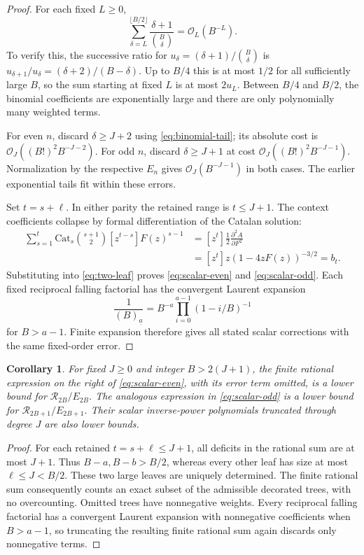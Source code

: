 \documentclass[11pt,letterpaper]{article}
\numberwithin{equation}{section}
\newtheorem{corollary}[theorem]{Corollary}
\theoremstyle{remark}\newtheorem{remark}[theorem]{Remark}
\newcommand{\Ord}{\mathcal O}
\newcommand{\fall}[2]{(#1)_{\underline{#2}}}
\begin{document}
\begin{proof}
For each fixed $L\ge0$,
\begin{equation}\label{eq:binomial-tail}
 \sum_{\delta=L}^{\lfloor B/2\rfloor}
        \frac{\delta+1}{\binom B\delta}=\Ord_L(B^{-L}).
\end{equation}
To verify this, the successive ratio for
$u_\delta=(\delta+1)/\binom B\delta$ is
$u_{\delta+1}/u_\delta=(\delta+2)/(B-\delta)$. Up to $B/4$ this is at most $1/2$ for all sufficiently large $B$, so the sum starting at fixed $L$ is at most $2u_L$. Between $B/4$ and $B/2$, the binomial coefficients are exponentially large and there are only polynomially many weighted terms.

For even $n$, discard $\delta\ge J+2$ using \eqref{eq:binomial-tail}; its absolute cost is $\Ord_J((B!)^2B^{-J-2})$. For odd $n$, discard $\delta\ge J+1$ at cost $\Ord_J((B!)^2B^{-J-1})$. Normalization by the respective $E_n$ gives $\Ord_J(B^{-J-1})$ in both cases. The earlier exponential tails fit within these errors.

Set $t=s+\ell$. In either parity the retained range is $t\le J+1$. The context coefficients collapse by formal differentiation of the Catalan solution:
\begin{align*}
 \sum_{s=1}^{t}\mathrm{Cat}_s\binom{s+1}{2}
                     [z^{t-s}]F(z)^{s-1}
 &= [z^t]\frac12\frac{\partial^2 A}{\partial F^2}\\
 &= [z^t]z(1-4zF(z))^{-3/2}=b_t.
\end{align*}
Substituting into \eqref{eq:two-leaf} proves \eqref{eq:scalar-even} and \eqref{eq:scalar-odd}. Each fixed reciprocal falling factorial has the convergent Laurent expansion
\[
 \frac1{\fall B a}=B^{-a}\prod_{i=0}^{a-1}(1-i/B)^{-1}
\]
for $B>a-1$. Finite expansion therefore gives all stated scalar corrections with the same fixed-order error.
\end{proof}

\begin{corollary}\label{cor:lower}
For fixed $J\ge0$ and integer $B>2(J+1)$, the finite rational expression on the right of \eqref{eq:scalar-even}, with its error term omitted, is a lower bound for $\mathcal R_{2B}/E_{2B}$. The analogous expression in \eqref{eq:scalar-odd} is a lower bound for $\mathcal R_{2B+1}/E_{2B+1}$. Their scalar inverse-power polynomials truncated through degree $J$ are also lower bounds.
\end{corollary}
\begin{proof}
For each retained $t=s+\ell\le J+1$, all deficits in the rational sum are at most $J+1$. Thus $B-a,B-b>B/2$, whereas every other leaf has size at most $\ell\le J<B/2$. These two large leaves are uniquely determined. The finite rational sum consequently counts an exact subset of the admissible decorated trees, with no overcounting. Omitted trees have nonnegative weights. Every reciprocal falling factorial has a convergent Laurent expansion with nonnegative coefficients when $B>a-1$, so truncating the resulting finite rational sum again discards only nonnegative terms.
\end{proof}
\end{document}
